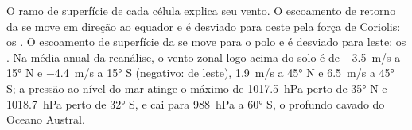 O ramo de superfície de cada célula explica seu vento. O escoamento de retorno da  se
move em direção ao equador e é desviado para oeste pela força de Coriolis: os . O escoamento
de superfície da  se move para o polo e é desviado para leste: os . Na
média anual da reanálise, o vento zonal logo acima do solo é de \qty{-3.5}{m/s} a \ang{15} N e
\qty{-4.4}{m/s} a \ang{15} S (negativo: de leste), \qty{+1.9}{m/s} a \ang{45} N e \qty{+6.5}{m/s} a
\ang{45} S; a pressão ao nível do mar atinge o máximo de \qty{1017.5}{hPa} perto de \ang{35} N e
\qty{1018.7}{hPa} perto de \ang{32} S, e cai para \qty{988}{hPa} a \ang{60} S, o profundo cavado do
Oceano Austral.

